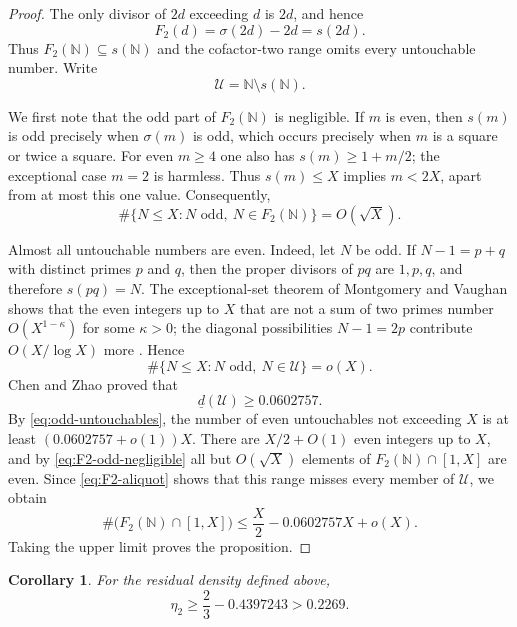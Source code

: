 \documentclass[11pt]{article}
\newtheorem{corollary}[theorem]{Corollary}
\theoremstyle{remark}
\newcommand{\N}{\mathbb N}
\newcommand{\1}{\mathbf 1}
\newcommand{\lowerdens}{\underline d}
\begin{document}
\begin{proof}
The only divisor of $2d$ exceeding $d$ is $2d$, and hence
\begin{equation}\label{eq:F2-aliquot}
 F_2(d)=\sigma(2d)-2d=s(2d).
\end{equation}
Thus $F_2(\N)\subseteq s(\N)$ and the cofactor-two range omits every
untouchable number.  Write
\[
 \mathcal U=\N\setminus s(\N).
\]

We first note that the odd part of $F_2(\N)$ is negligible.  If $m$ is even,
then $s(m)$ is odd precisely when $\sigma(m)$ is odd, which occurs precisely
when $m$ is a square or twice a square.  For even $m\geq4$ one also has
$s(m)\geq1+m/2$; the exceptional case $m=2$ is harmless.  Thus $s(m)\leq X$
implies $m<2X$, apart from at most this one value.  Consequently,
\begin{equation}\label{eq:F2-odd-negligible}
 \#\{N\leq X:N\text{ odd},\ N\in F_2(\N)\}=O(\sqrt X).
\end{equation}

Almost all untouchable numbers are even.  Indeed, let $N$ be odd.  If
$N-1=p+q$ with distinct primes $p$ and $q$, then the proper divisors of $pq$
are $1,p,q$, and therefore $s(pq)=N$.  The exceptional-set theorem of
Montgomery and Vaughan shows that the even integers up to $X$ that are not a
sum of two primes number $O(X^{1-\kappa})$ for some $\kappa>0$; the diagonal
possibilities $N-1=2p$ contribute $O(X/\log X)$ more \cite{MVGoldbach}.
Hence
\begin{equation}\label{eq:odd-untouchables}
 \#\{N\leq X:N\text{ odd},\ N\in\mathcal U\}=o(X).
\end{equation}
Chen and Zhao proved \cite{ChenZhao} that
\[
 \lowerdens(\mathcal U)\geq0.0602757.
\]
By \eqref{eq:odd-untouchables}, the number of even
untouchables not exceeding $X$ is at least
$(0.0602757+o(1))X$.  There are $X/2+O(1)$ even integers up to $X$, and by
\eqref{eq:F2-odd-negligible} all but $O(\sqrt X)$ elements of
$F_2(\N)\cap[1,X]$ are even.  Since \eqref{eq:F2-aliquot} shows that this
range misses every member of $\mathcal U$, we obtain
\[
 \#\bigl(F_2(\N)\cap[1,X]\bigr)
 \leq\frac X2-0.0602757X+o(X).
\]
Taking the upper limit proves the proposition.
\end{proof}

\begin{corollary}\label{cor:eta-two}
For the residual density defined above,
\[
 \eta_2\geq\frac23-0.4397243>0.2269.
\]
\end{corollary}
\end{document}
